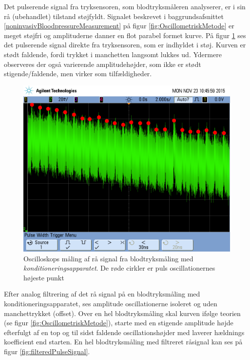 Det pulserende signal fra tryksensoren, som blodtryksmåleren analyserer, er i sin rå (ubehandlet) tilstand støjfyldt. Signalet beskrevet i baggrundsafsnittet \ref{noninvasivBloodpressureMeasurement} på figur \ref{fig:OscillometriskMetode} er meget støjfri og amplituderne danner en flot parabel formet kurve. På figur \ref{fig:rawPulseSignal} ses det pulserende signal direkte fra tryksensoren, som er indhyldet i støj. Kurven er stødt faldende, fordi trykket i manchetten langsomt lukkes ud. Ydermere observeres der også varierende amplitudehøjder, som ikke er stødt stigende/faldende, men virker som tilfældigheder.  

\begin{figure}[H]
	\centering
	\includegraphics[trim={0 7cm 0 1.5cm},clip, width=1\textwidth]{billeder/rawPulseSignalPeaks.png}
	\caption{Oscilloskops måling af rå signal fra blodtryksmåling med \textit{konditioneringsapparatet}. De røde cirkler er puls oscillationernes højeste punkt}\label{fig:rawPulseSignal}
\end{figure}

Efter analog filtrering af det rå signal på en blodtryksmåling med konditioneringsapparatet, ses amplitude oscillationerne isoleret og uden manchettrykket (offset). Over en hel blodtryksmåling skal kurven ifølge teorien (se figur \ref{fig:OscillometriskMetode}), starte med en stigende amplitude højde efterfulgt af en top og til sidst faldende oscillationshøjder med laverer hældnings koefficient end starten. En hel blodtryksmåling med filtreret råsignal kan ses på figur \ref{fig:filteredPulseSignal}.

